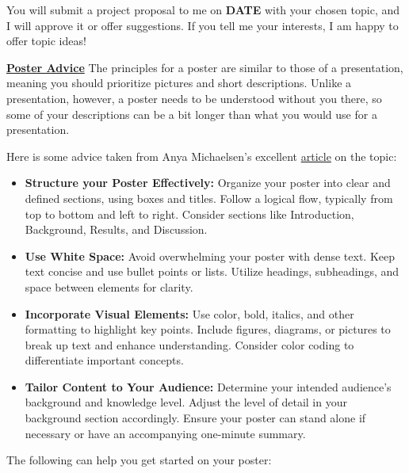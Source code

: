 \documentclass[12pt]{article}
\begin{document}
You will submit a project proposal to me on \textbf{DATE} with your chosen topic, and I will approve it or offer suggestions. If you tell me your interests, I am happy to offer topic ideas!

\textbf{\underline{Poster Advice}}
The principles for a poster are similar to those of a presentation, meaning you should prioritize pictures and short descriptions. Unlike a presentation, however, a poster needs to be understood without you there, so some of your descriptions can be a bit longer than what you would use for a presentation.

Here is some advice taken from Anya Michaelsen's excellent \href{https://www.ams.org/journals/notices/202002/rnoti-p189.pdf}{article} on the topic:
\begin{itemize}
    \item \textbf{Structure your Poster Effectively:} Organize your poster into clear and defined sections, using boxes and titles. Follow a logical flow, typically from top to bottom and left to right. Consider sections like Introduction, Background, Results, and Discussion.

    \item \textbf{Use White Space:} Avoid overwhelming your poster with dense text. Keep text concise and use bullet points or lists. Utilize headings, subheadings, and space between elements for clarity.

    \item \textbf{Incorporate Visual Elements:} Use color, bold, italics, and other formatting to highlight key points. Include figures, diagrams, or pictures to break up text and enhance understanding. Consider color coding to differentiate important concepts.

    \item \textbf{Tailor Content to Your Audience:} Determine your intended audience's background and knowledge level. Adjust the level of detail in your background section accordingly. Ensure your poster can stand alone if necessary or have an accompanying one-minute summary.
\end{itemize}
\newpage
The following can help you get started on your poster:
\end{document}
